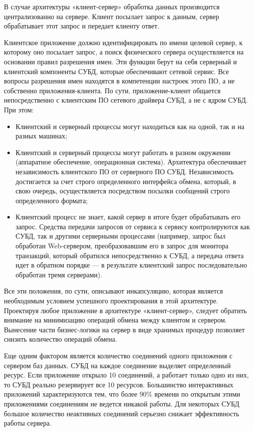 В случае архитектуры «клиент-сервер» обработка данных производится централизованно на сервере.
Клиент посылает запрос к данным, сервер обрабатывает этот запрос и передает клиенту ответ.

Клиентское приложение должно идентифицировать по имени целевой сервер, к которому оно посылает запрос, а поиск физического сервера осуществляется на основании правил разрешения имен.
Эти функции берут на себя серверный и клиентский компоненты СУБД, которые обеспечивают сетевой сервис.
Все вопросы разрешения имен находятся в компетенции настроек этого ПО, а не собственно приложения-клиента.
По сути, приложение-клиент общается непосредственно с клиентским ПО сетевого драйвера СУБД, а не с ядром СУБД.
При этом:
\begin{itemize}
    \item Клиентский и серверный процессы могут находиться как на одной, так и на разных машинах;
    \item Клиентский и серверный процессы могут работать в разном окружении (аппаратное обеспечение, операционная система).
    Архитектура обеспечивает независимость клиентского ПО от серверного ПО СУБД.
    Независимость достигается за счет строго определенного интерфейса обмена, который, в свою очередь, осуществляется посредством посылки сообщений строго определенного формата;
    \item Клиентский процесс не знает, какой сервер в итоге будет обрабатывать его запрос.
    Средства передачи запросов от сервиса к сервису контролируются как СУБД, так и другими серверными процессами (например, запрос был обработан Web-сервером, преобразовавшим его в запрос для монитора транзакций, который обратился непосредственно к СУБД, а передача ответа идет в обратном порядке — в результате клиентский запрос последовательно обработан тремя серверами).
\end{itemize}

Все эти положения, по сути, описывают инкапсуляцию, которая является необходимым условием успешного проектирования в этой архитектуре.
Проектируя любое приложение в архитектуре «клиент-сервер», следует обратить внимание на минимизацию операций обмена между клиентом и сервером.
Вынесение части бизнес-логики на сервер в виде хранимых процедур позволяет снизить количество операций обмена.

Еще одним фактором является количество соединений одного приложения с сервером баз данных.
СУБД на каждое соединение выделяет определенный ресурс.
Если приложение открыло 10 соединений, а работает только одно из них, то СУБД реально резервирует все 10 ресурсов.
Большинство интерактивных приложений характеризуются тем, что более 90\% времени по открытым этими приложениями соединениям не ведется никакой работы.
Для некоторых СУБД большое количество неактивных соединений серьезно снижает эффективность работы сервера.

